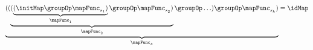 \begin{equation}
    \centering
    \label{equ:seqid}
    \begin{aligned}
            \underbrace{((
            \underbrace{(
            \underbrace{(\initMap \groupOp \mapFunc_{s_1})}_{\mapFunc_1}
            \groupOp \mapFunc_{s_2})}_{\mapFunc_2}
            \groupOp \ldots)
            \groupOp \mapFunc_{s_k})}_{\mapFunc_k}
            = \idMap
    \end{aligned}
\end{equation}
